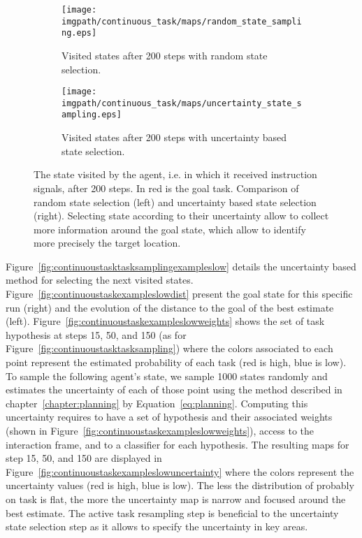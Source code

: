 
\begin{figure}[!htbp]
\centering
    \begin{subfigure}[t]{0.49\columnwidth}
        \centering
        \texttt{[image: \\imgpath/continuous\_task/maps/random\_state\_sampling.eps]}
        \caption{Visited states after 200 steps with random state selection.}
        \label{fig:continuousstaterandomstates}
    \end{subfigure}
    \begin{subfigure}[t]{0.49\columnwidth}
        \centering
        \texttt{[image: \\imgpath/continuous\_task/maps/uncertainty\_state\_sampling.eps]}
        \caption{Visited states after 200 steps with uncertainty based state selection.}
        \label{fig:continuousstateuncertaintystates}
    \end{subfigure}
\caption{The state visited by the agent, i.e. in which it received instruction signals, after 200 steps. In red is the goal task. Comparison of random state selection (left) and uncertainty based state selection (right). Selecting state according to their uncertainty allow to collect more information around the goal state, which allow to identify more precisely the target location.}
\label{fig:continuoustaskstatesampling}
\end{figure}

Figure~\ref{fig:continuoustasktasksamplingexampleslow} details the uncertainty based method for selecting the next visited states. Figure~\ref{fig:continuoustaskexampleslowdist} present the goal state for this specific run (right) and the evolution of the distance to the goal of the best estimate (left). Figure~\ref{fig:continuoustaskexampleslowweights} shows the set of task hypothesis at steps 15, 50, and 150 (as for Figure~\ref{fig:continuoustasktasksampling}) where the colors associated to each point represent the estimated probability of each task (red is high, blue is low). To sample the following agent's state, we sample 1000 states randomly and estimates the uncertainty of each of those point using the method described in chapter~\ref{chapter:planning} by Equation~\ref{eq:planning}. Computing this uncertainty requires to have a set of hypothesis and their associated weights (shown in Figure~\ref{fig:continuoustaskexampleslowweights}), access to the interaction frame, and to a classifier for each hypothesis. The resulting maps for step 15, 50, and 150 are displayed in Figure~\ref{fig:continuoustaskexampleslowuncertainty} where the colors represent the uncertainty values (red is high, blue is low). The less the distribution of probably on task is flat, the more the uncertainty map is narrow and focused around the best estimate. The active task resampling step is beneficial to the uncertainty state selection step as it allows to specify the uncertainty in key areas.

